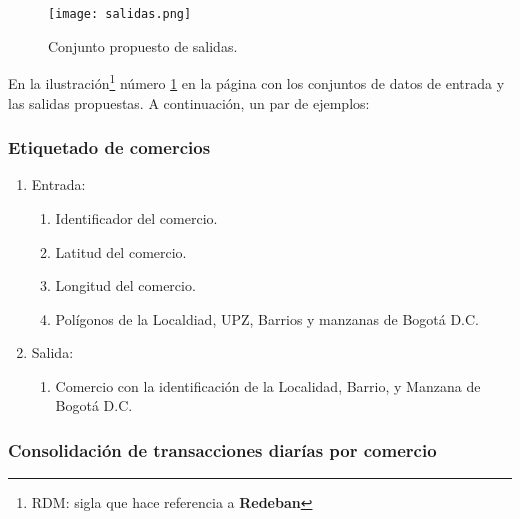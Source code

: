 \documentclass[a4paper]{article}
\begin{document}
\begin{figure}[h]
    \centering
	\texttt{[image: salidas.png]}
    \caption{Conjunto propuesto de salidas.}
    \label{fig:conjunto_salidas}
\end{figure}

En la ilustración\footnote{RDM: sigla que hace referencia a \textbf{Redeban}} número \ref{fig:conjunto_salidas} en la página \pageref{fig:conjunto_salidas} con los conjuntos de datos de entrada y las salidas propuestas. A continuación, un par de ejemplos:

\subsubsection*{Etiquetado de comercios}

\begin{enumerate}
	\item Entrada:
	\begin{enumerate}
		\item Identificador del comercio.
		\item Latitud del comercio.
		\item Longitud del comercio.
		\item Polígonos de la Localdiad, UPZ, Barrios y manzanas de Bogotá D.C.
	\end{enumerate}
	\item Salida:
	\begin{enumerate}
		\item Comercio con la identificación de la Localidad, Barrio, y Manzana de Bogotá D.C.
	\end{enumerate}
\end{enumerate}

\subsubsection{Consolidación de transacciones diarías por comercio}
\end{document}
